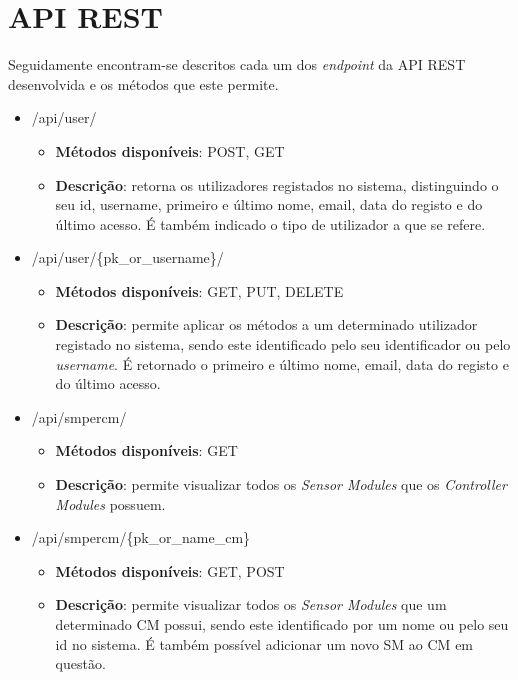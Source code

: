 \chapter{\acl{API} \acs{REST}}
\label{espcifAPIREST}

Seguidamente encontram-se descritos cada um dos \textit{endpoint} da \ac{API} \ac{REST} desenvolvida e os métodos que este permite. 

\begin{itemize}
	\item /api/user/
		\begin{itemize}
			\item\textbf{Métodos disponíveis}: POST, GET
			\item \textbf{Descrição}: retorna os utilizadores registados no sistema, distinguindo o seu id, username, primeiro e último nome, email, data do registo e do último acesso. É também indicado o tipo de utilizador a que se refere. 
		\end{itemize}

	
	\item /api/user/\{pk\_or\_username\}/
		\begin{itemize}
			\item \textbf{Métodos disponíveis}: GET, PUT, DELETE
			\item \textbf{Descrição}: permite aplicar os métodos a um determinado utilizador registado no sistema, sendo este identificado pelo seu identificador ou pelo \textit{username}. É retornado o primeiro e último nome, email, data do registo e do último acesso.
		\end{itemize}
		
	\item /api/smpercm/
	\begin{itemize}
		\item \textbf{Métodos disponíveis}: GET
		\item \textbf{Descrição}: permite visualizar todos os \textit{Sensor Modules} que os \textit{Controller Modules} possuem.  
	\end{itemize}
	
	\newpage
	
	\item /api/smpercm/\{pk\_or\_name\_cm\}
	\begin{itemize}
		\item \textbf{Métodos disponíveis}: GET, POST
		\item \textbf{Descrição}: permite visualizar todos os \textit{Sensor Modules} que um determinado \acl{CM} possui, sendo este identificado por um nome ou pelo seu id no sistema. É também possível adicionar um novo \acl{SM} ao \acl{CM} em questão. 
	\end{itemize}
	

\end{itemize}
